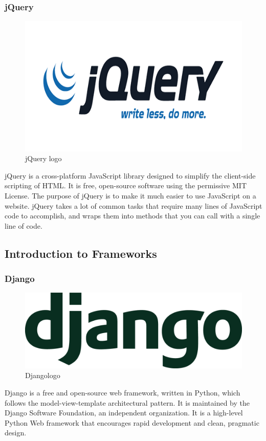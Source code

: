 \subsubsection{jQuery} 
\begin{figure}[h!]
\centering \includegraphics[scale=0.3]{input/images/jquery.png}
\caption{jQuery logo}
\end{figure}
jQuery is a cross-platform JavaScript library designed to simplify the client-side scripting of HTML. It is free, open-source software using the permissive MIT License. The purpose of jQuery is to make it much easier to use JavaScript on a website. jQuery takes a lot of common tasks that require many lines of JavaScript code to accomplish, and wraps them into methods that you can call with a single line of code.



\subsection{Introduction to Frameworks}
\subsubsection{Django}
\begin{figure}[h!]
\centering \includegraphics[scale=0.2]{input/images/django.png}
\caption{Djangologo}
\end{figure}
Django is a free and open-source web framework, written in Python, which follows the model-view-template architectural pattern. It is maintained by the Django Software Foundation, an independent organization. It is a high-level Python Web framework that encourages rapid development and clean, pragmatic design.



